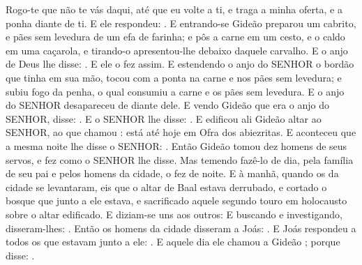 {{  Rogo-te que não te vás daqui, até que eu volte a ti, e traga a minha oferta, e a ponha diante de ti}. E ele respondeu: .
  E entrando-se Gideão preparou um cabrito, e pães sem levedura de um efa de farinha; e pôs a carne em um cesto, e o caldo em uma caçarola, e tirando-o apresentou-lhe debaixo daquele carvalho.
  E o anjo de Deus lhe disse: . E ele o fez assim.
  E estendendo o anjo do SENHOR o bordão que tinha em sua mão, tocou com a ponta na carne e nos pães sem levedura; e subiu fogo da penha, o qual consumiu a carne e os pães sem levedura. E o anjo do SENHOR desapareceu de diante dele.
  E vendo Gideão que era o anjo do SENHOR, disse: .
  E o SENHOR lhe disse: .
  E edificou ali Gideão altar ao SENHOR, ao que chamou : está até hoje em Ofra dos abiezritas.
  E aconteceu que a mesma noite lhe disse o SENHOR: .
  Então Gideão tomou dez homens de seus servos, e fez como o SENHOR lhe disse. Mas temendo fazê-lo de dia, pela família de seu pai e pelos homens da cidade, o fez de noite.
  E à manhã, quando os da cidade se levantaram, eis que o altar de Baal estava derrubado, e cortado o bosque que junto a ele estava, e sacrificado aquele segundo touro em holocausto sobre o altar edificado.
  E diziam-se uns aos outros:  E buscando e investigando, disseram-lhes: . Então os homens da cidade disseram a Joás:
  .
  E Joás respondeu a todos os que estavam junto a ele: .
  E aquele dia ele chamou a Gideão ; porque disse: .
}
